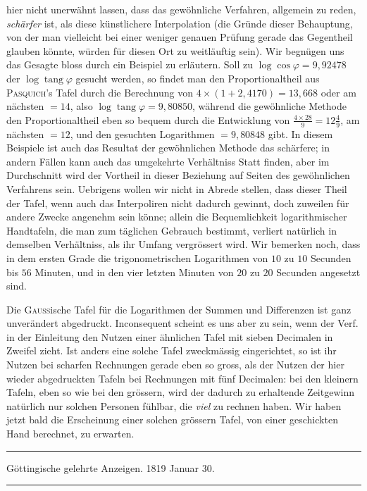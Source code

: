 hier nicht unerwähnt lassen, dass das gewöhnliche Verfahren, allgemein zu reden,
\textit{schärfer} ist, als diese künstlichere Interpolation (die Gründe dieser Behauptung,
von der man vielleicht bei einer weniger genauen Prüfung gerade das Gegentheil
glauben könnte, würden für diesen Ort zu weitläuftig sein). Wir begnügen uns
das Gesagte bloss durch ein Beispiel zu erläutern. Soll zu \(\log\cos\varphi=9{,}92478\)
der \(\log\operatorname{tang}\varphi\) gesucht werden, so findet man den Proportionaltheil aus \textsc{Pasquich}'s Tafel durch die Berechnung von \(4\times(1+2{,}4170)=13{,}668\) oder am nächsten \(=14\), also \(\log\operatorname{tang}\varphi=9{,}80850\), während die gewöhnliche Methode den
Proportionaltheil eben so bequem durch die Entwicklung von \(\frac{4\times28}{9}=12\frac49\), am
nächsten \(=12\), und den gesuchten Logarithmen \(=9{,}80848\) gibt. In diesem
Beispiele ist auch das Resultat der gewöhnlichen Methode das schärfere; in andern Fällen kann auch das umgekehrte Verhältniss Statt finden, aber im Durchschnitt wird der Vortheil in dieser Beziehung auf Seiten des gewöhnlichen Verfahrens sein. Uebrigens wollen wir nicht in Abrede stellen, dass dieser Theil
der Tafel, wenn auch das Interpoliren nicht dadurch gewinnt, doch zuweilen für
andere Zwecke angenehm sein könne; allein die Bequemlichkeit logarithmischer
Handtafeln, die man zum täglichen Gebrauch bestimmt, verliert natürlich in demselben Verhältniss, als ihr Umfang vergrössert wird. Wir bemerken noch, dass
in dem ersten Grade die trigonometrischen Logarithmen von \(10\) zu \(10\) Secunden
bis \(56\) Minuten, und in den vier letzten Minuten von \(20\) zu \(20\) Secunden angesetzt sind.

Die \textsc{Gauss}ische Tafel für die Logarithmen der Summen und Differenzen ist
ganz unverändert abgedruckt. Inconsequent scheint es uns aber zu sein, wenn
der Verf. in der Einleitung den Nutzen einer ähnlichen Tafel mit sieben Decimalen in Zweifel zieht. Ist anders eine solche Tafel zweckmässig eingerichtet, so ist
ihr Nutzen bei scharfen Rechnungen gerade eben so gross, als der Nutzen der
hier wieder abgedruckten Tafeln bei Rechnungen mit fünf Decimalen: bei den
kleinern Tafeln, eben so wie bei den grössern, wird der dadurch zu erhaltende
Zeitgewinn natürlich nur solchen Personen fühlbar, die \textit{viel} zu rechnen haben.
Wir haben jetzt bald die Erscheinung einer solchen grössern Tafel, von einer geschickten Hand berechnet, zu erwarten.

\par{}\medskip\hrule\smallskip
\begin{center}
Göttingische gelehrte Anzeigen. 1819 Januar 30.
\end{center}
\smallskip\hrule\medskip

